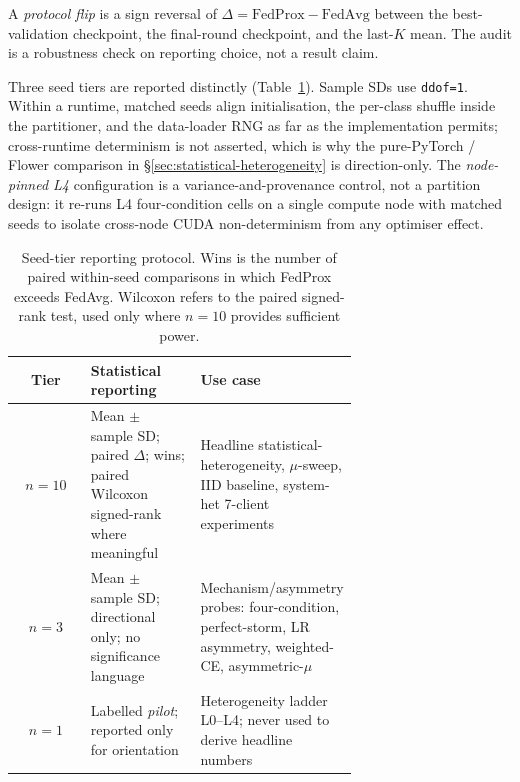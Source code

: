 \documentclass[11pt,a4paper]{report}
\begin{document}
A \emph{protocol flip} is a sign reversal of $\Delta = \mathrm{FedProx}
- \mathrm{FedAvg}$ between the best-validation checkpoint, the
final-round checkpoint, and the last-$K$ mean. The audit is a
robustness check on reporting choice, not a result claim.

Three seed tiers are reported distinctly (Table~\ref{tab:seed-tiers}).
Sample SDs use \texttt{ddof=1}. Within a runtime, matched seeds align
initialisation, the per-class shuffle inside the partitioner, and the
data-loader RNG as far as the implementation permits; cross-runtime
determinism is not asserted, which is why the pure-PyTorch / Flower
comparison in §\ref{sec:statistical-heterogeneity} is direction-only.
The \emph{node-pinned L4} configuration is a variance-and-provenance
control, not a partition design: it re-runs L4 four-condition cells on
a single compute node with matched seeds to isolate cross-node CUDA
non-determinism from any optimiser effect.

\begin{table}[H]
\centering
\small
\caption{Seed-tier reporting protocol. Wins is the number of paired
within-seed comparisons in which FedProx exceeds FedAvg. Wilcoxon refers
to the paired signed-rank test, used only where $n = 10$ provides
sufficient power.}
\label{tab:seed-tiers}
\begin{tabular}{c p{0.32\linewidth} p{0.36\linewidth}}
\hline
Tier         & Statistical reporting                                                                            & Use case                                                                                                  \\
\hline
$n = 10$     & Mean $\pm$ sample SD; paired $\Delta$; wins; paired Wilcoxon signed-rank where meaningful        & Headline statistical-heterogeneity, $\mu$-sweep, IID baseline, system-het 7-client experiments            \\
$n = 3$      & Mean $\pm$ sample SD; directional only; no significance language                                & Mechanism/asymmetry probes: four-condition, perfect-storm, LR asymmetry, weighted-CE, asymmetric-$\mu$    \\
$n = 1$      & Labelled \emph{pilot}; reported only for orientation                                            & Heterogeneity ladder L0--L4; never used to derive headline numbers                                        \\
\hline
\end{tabular}
\end{table}
\end{document}
